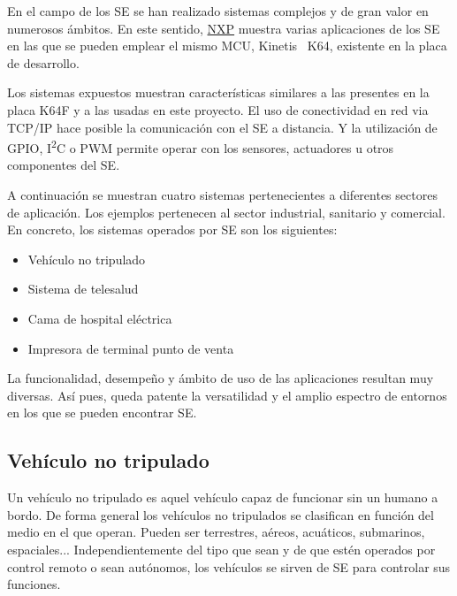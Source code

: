 En el campo de los SE se han realizado sistemas complejos y de gran valor en 
numerosos ámbitos. En este sentido, \href{https://www.nxp.com/products/processors-and-microcontrollers/arm-based-processors-and-mcus/kinetis-cortex-m-mcus/k-seriesperformancem4/k6x-ethernet/kinetis-k64-120-mhz-256kb-sram-microcontrollers-mcus-based-on-arm-cortex-m4-core:K64_120}
{NXP} muestra varias aplicaciones de los SE en las que se pueden emplear el
mismo MCU, Kinetis~\textsuperscript{\tiny\textregistered} K64, existente en la
placa de desarrollo.

Los sistemas expuestos muestran características similares a las presentes en la
placa K64F y a las usadas en este proyecto. El uso de conectividad en red via
TCP/IP hace posible la comunicación con el SE a distancia. Y la utilización de
GPIO, I\textsuperscript{2}C o PWM permite operar con los sensores, actuadores u
otros componentes del SE.

A continuación se muestran cuatro sistemas pertenecientes a diferentes sectores
de aplicación. Los ejemplos pertenecen al sector industrial, sanitario y
comercial. En concreto, los sistemas operados por SE son los siguientes:

\begin{itemize}
  \item Vehículo no tripulado
  \item Sistema de telesalud
  \item Cama de hospital eléctrica
  \item Impresora de terminal punto de venta
\end{itemize}

La funcionalidad, desempeño y ámbito de uso de las aplicaciones resultan muy
diversas. Así pues, queda patente la versatilidad y el amplio espectro de
entornos en los que se pueden encontrar SE.

\subsection{Vehículo no tripulado}{\label{sec:uv}}
Un vehículo no tripulado es aquel vehículo capaz de funcionar sin un humano a
bordo. De forma general los vehículos no tripulados se clasifican en función del
medio en el que operan. Pueden ser terrestres, aéreos, acuáticos, submarinos,
espaciales... Independientemente del tipo que sean y de que estén operados por
control remoto o sean autónomos, los vehículos se sirven de SE para controlar
sus funciones.

